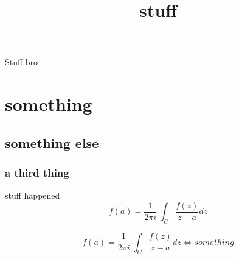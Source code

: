 \documentclass[12pt]{article}
\title{stuff}
\begin{document}

\newpage
\tableofcontents
\newpage
    Stuff bro
    \section{something}
    \subsection{something else}
    \subsubsection{a third thing}
    stuff happened
\begin{equation}
  \label{eq:1}
    f(a) =\frac{1}{2 \pi i}\ \int_{C} \frac{f(z)}{z-a}dz
\end{equation}

\begin{equation}
\label{eq:2}
f(a) =\frac{1}{2\pi i}\ \int_{C} \frac{f(z)}{z-a}dz \iff something
\end{equation}
\hr
\end{document}
